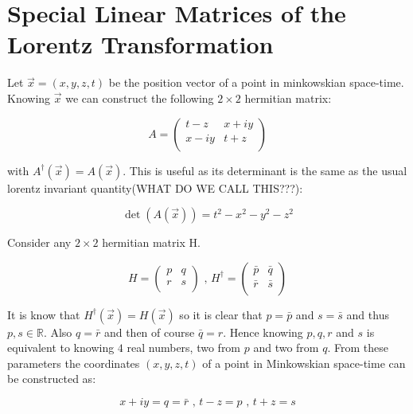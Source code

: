 \section{Special Linear Matrices of the Lorentz Transformation}\label{Special_Linear_Matrices_of_Lorentz}

Let $\vec{x} = (x,y,z,t)$ be the position vector of a point in minkowskian space-time. Knowing $\vec{x}$ we can construct the following $2 \times 2$ hermitian matrix:

\begin{equation}\label{Special_Matrices_A_first}
A = 
\left( 
\begin{array}{cc}
t-z    & x + i y \\
x - iy & t+z \\
\end{array} 
\right)  
\end{equation}

\noindent with $A^{\dagger}(\vec{x}) = A(\vec{x})$. This is useful as its determinant is the same as the usual lorentz invariant quantity(WHAT DO WE CALL THIS???):

\begin{equation*}
\det(A(\vec{x})) = t^2 - x^2 - y^2 - z^2
\end{equation*}

Consider any $2 \times 2$ hermitian matrix H. 

\begin{equation*}
H = \left( \begin{array}{cc}
p & q \\
r & s \\
\end{array} \right) \text{ ,     }
H^{\dagger} = \left( \begin{array}{cc}
\bar{p} & \bar{q} \\
\bar{r} & \bar{s} \\
\end{array} \right)
\end{equation*}

\noindent It is know that $H^{\dagger}(\vec{x}) = H(\vec{x})$ so it is clear that $p = \bar{p}$ and $s = \bar{s}$ and thus $p,s \in \mathbb{R}$. Also $q = \bar{r}$ and then of course $\bar{q} = r$. Hence knowing $p,q,r$ and $s$ is equivalent to knowing $4$ real numbers, two from $p$ and two from $q$. From these parameters the coordinates $(x,y,z,t)$ of a point in Minkowskian space-time can be constructed as:

\begin{equation*}
x + iy = q = \bar{r} \text{ ,   } t - z = p \text{ ,   } t+z = s
\end{equation*}

